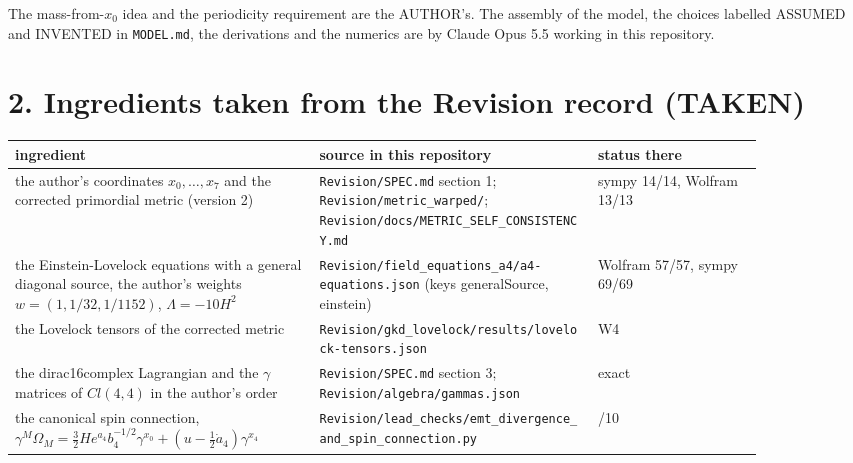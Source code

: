 \documentclass[11pt]{article}
\begin{document}
The mass-from-$x_0$ idea and the periodicity requirement are the AUTHOR's. The assembly of the model, the choices labelled ASSUMED and INVENTED in \texttt{MODEL.\allowbreak{}md}, the derivations and the numerics are by Claude Opus 5.5 working in this repository.

\section*{2. Ingredients taken from the Revision record (TAKEN)}

\begin{longtable}{>{\raggedright\arraybackslash}p{0.357\linewidth}>{\raggedright\arraybackslash}p{0.320\linewidth}>{\raggedright\arraybackslash}p{0.192\linewidth}}
\toprule
\textbf{ingredient} & \textbf{source in this repository} & \textbf{status there} \\
\midrule
the author's coordinates $x_0, \dots, x_7$ and the corrected primordial metric (version 2) & \texttt{Revision/\allowbreak{}SPEC.\allowbreak{}md} section 1; \texttt{Revision/\allowbreak{}metric\_\allowbreak{}warped/\allowbreak{}}; \texttt{Revision/\allowbreak{}docs/\allowbreak{}METRIC\_\allowbreak{}SELF\_\allowbreak{}CONSISTENCY.\allowbreak{}md} & sympy 14/14, Wolfram 13/13 \\
the Einstein-Lovelock equations with a general diagonal source, the author's weights $w = (1, 1/32, 1/1152)$, $\Lambda = -10H^2$ & \texttt{Revision/\allowbreak{}field\_\allowbreak{}equations\_\allowbreak{}a4/\allowbreak{}a4-{}\allowbreak{}equations.\allowbreak{}json} (keys generalSource, einstein) & Wolfram 57/57, sympy 69/69 \\
the Lovelock tensors of the corrected metric & \texttt{Revision/\allowbreak{}gkd\_\allowbreak{}lovelock/\allowbreak{}results/\allowbreak{}lovelock-{}\allowbreak{}tensors.\allowbreak{}json} & W4 \\
the dirac16complex Lagrangian and the $\gamma$ matrices of $Cl(4,4)$ in the author's order & \texttt{Revision/\allowbreak{}SPEC.\allowbreak{}md} section 3; \texttt{Revision/\allowbreak{}algebra/\allowbreak{}gammas.\allowbreak{}json} & exact \\
the canonical spin connection, $\gamma^M\Omega_M = \frac32 He^{a_4}b_4^{-1/2}\gamma^{x_0} + (u - \frac12\dot a_4)\gamma^{x_4}$ & \texttt{Revision/\allowbreak{}lead\_\allowbreak{}checks/\allowbreak{}emt\_\allowbreak{}divergence\_\allowbreak{}and\_\allowbreak{}spin\_\allowbreak{}connection.\allowbreak{}py} & 10/10 \\

\end{longtable}
\end{document}
